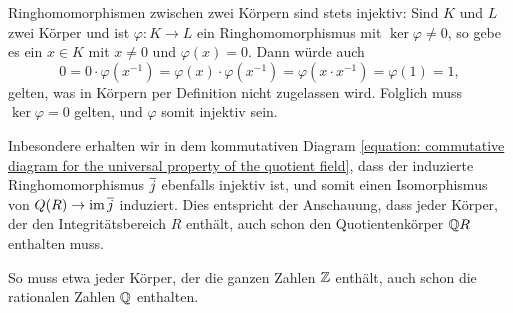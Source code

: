 \begin{remark}
  Ringhomomorphismen zwischen zwei Körpern sind stets injektiv:
  Sind $K$ und $L$ zwei Körper und ist $\varphi \colon K \to L$ ein Ringhomomorphismus mit $\ker \varphi \neq 0$, so gebe es ein $x \in K$ mit $x \neq 0$ und $\varphi(x) = 0$.
  Dann würde auch
  \[
      0
    = 0 \cdot \varphi(x^{-1})
    = \varphi(x) \cdot \varphi(x^{-1})
    = \varphi(x \cdot x^{-1})
    = \varphi(1)
    = 1,
  \]
  gelten, was in Körpern per Definition nicht zugelassen wird.
  Folglich muss $\ker \varphi = 0$ gelten, und $\varphi$ somit injektiv sein.
  
  Inbesondere erhalten wir in dem kommutativen Diagram \eqref{equation: commutative diagram for the universal property of the quotient field}, dass der induzierte Ringhomomorphismus $\overline{j}$ ebenfalls injektiv ist, und somit einen Isomorphismus von $Q(R) \to \operatorname{im} \overline{j}$ induziert.
  Dies entspricht der Anschauung, dass jeder Körper, der den Integritätsbereich $R$ enthält, auch schon den Quotientenkörper $\mathbb{Q}{R}$ enthalten muss.
  
  So muss etwa jeder Körper, der die ganzen Zahlen $\mathbb{Z}$ enthält, auch schon die rationalen Zahlen $\mathbb{Q}$ enthalten.
\end{remark}


